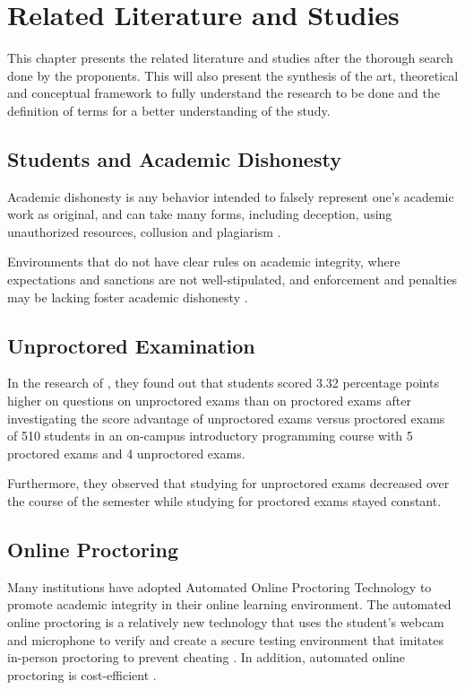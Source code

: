 \chapter{Related Literature and Studies}

This chapter presents the related literature and studies after the thorough search done by the proponents.
This will also present the synthesis of the art, theoretical and conceptual framework to fully understand the research to be done and the definition of terms for a better understanding of the study.

\section*{Students and Academic Dishonesty}

Academic dishonesty is any behavior intended to falsely represent one's academic work as original, and can take many forms, including deception, using unauthorized resources, collusion and plagiarism \cite{norris2019university,golden2020addressing}.

Environments that do not have clear rules on academic integrity, where expectations and sanctions are not well-stipulated, and enforcement and penalties may be lacking foster academic dishonesty \cite{finchilescu2018perceptions}.

\section*{Unproctored Examination}

In the research of , they found out that students scored 3.32 percentage points higher on questions on unproctored exams than on proctored exams after investigating the score advantage of unproctored exams versus proctored exams of 510 students in an on-campus introductory programming course with 5 proctored exams and 4 unproctored exams.

Furthermore, they observed that studying for unproctored exams decreased over the course of the semester while studying for proctored exams stayed constant.

\section*{Online Proctoring}

Many institutions have adopted Automated Online Proctoring Technology to promote academic integrity in their online learning environment.
The automated online proctoring is a relatively new technology that uses the student's webcam and microphone to verify and create a secure testing environment that imitates in-person proctoring to prevent cheating \cite{karim2014cheating}.
In addition, automated online proctoring is cost-efficient \cite{atoum2017automated}.

